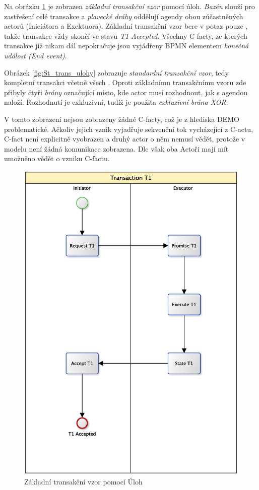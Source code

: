 \documentclass[]{article}
\begin{document}
Na obrázku \ref{fig:Zk_trans_ulohy} je zobrazen \textit{základní transakční vzor} pomocí úloh. \textit{Bazén} slouží pro zastřešení celé transakce a \textit{plavecké dráhy} oddělují agendy obou zúčastněných actorů (Iniciátora a Exektuora). Základní transakční vzor bere v potaz pouze , takže transakce vždy skončí ve stavu \textit{T1 Accepted}. Všechny C-facty, ze kterých transakce již nikam dál nepokračuje jsou vyjádřeny BPMN elementem \textit{konečná událost (End event)}.

Obrázek \ref{fig:St_trans_ulohy} zobrazuje \textit{standardní transakční vzor}, tedy kompletní transakci včetně všech . Oproti základnímu transakčnímu vzoru zde přibyly čtyři \textit{brány} označující místo, kde actor musí rozhodnout, jak s agendou naloží. Rozhodnutí je exkluzivní, tudíž je použita \textit{exkluzivní brána XOR}.

V tomto zobrazení nejsou zobrazeny žádné C-facty, což je z hlediska DEMO problematické. Ačkoliv jejich vznik vyjadřuje sekvenční tok vycházející z C-actu, C-fact není explicitně vyobrazen a druhý actor o něm nemusí vědět, protože v modelu není žádná komunikace zobrazena. Dle \cite{Dietz2006} však oba Actoři mají mít umožněno vědět o vzniku C-factu.

\begin{figure}[H]\centering
\includegraphics[width=1.0\textwidth]{obrazky/transaction-basic-tasks}
\caption{Základní transakční vzor pomocí Úloh}
\label{fig:Zk_trans_ulohy}
\end{figure}
\end{document}

